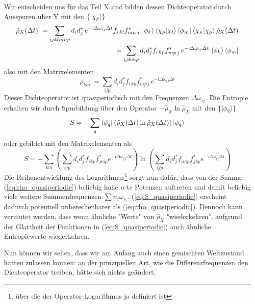 \documentclass[12pt]{article}
\begin{document}
Wir entscheiden uns für das Teil X und bilden dessen Dichteoperator durch Ausspuren über Y mit den $\{\ket{\chi_p}\}$
\begin{equation}
\label{eq:rho_quasiperiodic}
\begin{split}
\hat{\rho}_X(\Delta t)
\ = \sum_{ijklmnp}d_{i}d_{j}^*\, e^{-\mathrm i \Delta\omega_{ij}\Delta t} 
f_{i\,kl}f_{mn\,j}^*\, \ket{\phi_k}\bra{\chi_p}\ket{\chi_l}\bra{\phi_m}\bra{\chi_n}\ket{\chi_p}
\hat{\rho}_X(\Delta t) 
\\
= \sum_{ijkmp}d_{i}d_{j}^* f_{i\,kp}f_{mp\,j}^*\, e^{-\mathrm i \Delta\omega_{ij}\Delta t} 
\, \ket{\phi_k}\bra{\phi_m} 
\end{split}
\end{equation}
also mit den Matrixelementen
\begin{equation}
\label{eq:rho_matrix_quasiperiodic}
\rho_{km}\ = \sum_{ijp}d_{i}d_{j}^* f_{i\,kp}f_{mp\,j}^*\, e^{-\mathrm i \Delta\omega_{ij}\Delta t} 
\end{equation}
Dieser Dichteoperator ist quasiperiodisch mit den Frequenzen $\Delta \omega_{ij}$. Die Entropie erhalten wir durch Spurbildung über den Operator $-\hat{\rho}_X \ln \hat{\rho}_X$ mit den $\{\ket{\phi_q}\}$
\begin{equation}
\label{eq:S_quasiperiodic}
S = -\sum_q \bra{\phi_q} \left( \hat{\rho}_X(\Delta t) \ln \hat{\rho}_X(\Delta t) \right) \ket{\phi_q}
\end{equation}
oder gebildet mit den Matrixelementen als
\begin{equation}
\label{eq:S_matrix_quasiperiodic}
S = -\sum_{km}\left(\sum_{ijp}d_{i}d_{j}^* f_{ikp}f_{jmp}^* e^{-\mathrm i \Delta\omega_{ij}\Delta t}\right)
\ln \left(\sum_{ijp}d_{i}d_{j}^* f_{imp}f_{jkp}^* e^{-\mathrm i \Delta\omega_{ij}\Delta t}\right)
\end{equation}
Die Reihenentwicklung des Logarithmus\footnote{über die der Operator-Logarithmus ja definiert ist} sorgt nun dafür, dass von der Summe (\ref{eq:rho_quasiperiodic}) beliebig hohe $n$-te Potenzen auftreten und damit beliebig viele weitere Summenfrequenzen $\sum n_i\omega_{r_i}$. (\ref{eq:S_quasiperiodic}) erscheint dadurch potentiell unberechenbarer als (\ref{eq:rho_quasiperiodic}). Dennoch kann vermutet werden, dass wenn ähnliche "Werte" von $\hat{\rho}_X$ "wiederkehren", aufgrund der Glattheit der Funktionen in (\ref{eq:S_quasiperiodic}) auch ähnliche Entropiewerte wiederkehren.

Nun können wir sehen, dass wir am Anfang auch einen gemischten Weltzustand hätten zulassen können: an der prinzipiellen Art, wie die Differenzfrequenzen den Dichteoperator treiben, hätte sich nichts geändert.
\end{document}
